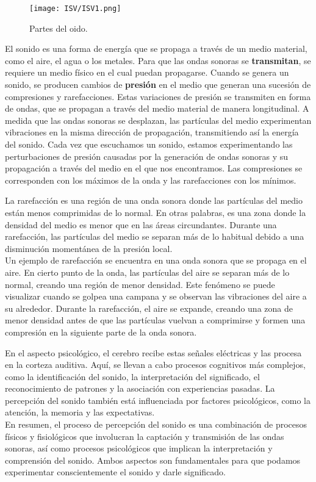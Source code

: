\documentclass[
	12pt, %
	fleqn, %
	a4paper, %
	oneside, %
]{LegrandOrangeBook}
\begin{document}
\begin{figure}[H]
\centering
\texttt{[image: ISV/ISV1.png]}
\caption{Partes del oido.}
\end{figure}
El sonido es una forma de energía que se propaga a través de un medio material, como el aire, el agua o los metales. Para que las ondas sonoras se \textbf{transmitan}, se requiere un medio físico en el cual puedan propagarse. Cuando se genera un sonido, se producen cambios de \textbf{presión} en el medio que generan una sucesión de compresiones y rarefacciones. Estas variaciones de presión se transmiten en forma de ondas, que se propagan a través del medio material de manera longitudinal. A medida que las ondas sonoras se desplazan, las partículas del medio experimentan vibraciones en la misma dirección de propagación, transmitiendo así la energía del sonido. Cada vez que escuchamos un sonido, estamos experimentando las perturbaciones de presión causadas por la generación de ondas sonoras y su propagación a través del medio en el que nos encontramos. Las compresiones se corresponden con los máximos de la onda y las rarefacciones con los mínimos.
\begin{vocabulary}[Rarefacción]
La rarefacción es una región de una onda sonora donde las partículas del medio están menos comprimidas de lo normal. En otras palabras, es una zona donde la densidad del medio es menor que en las áreas circundantes. Durante una rarefacción, las partículas del medio se separan más de lo habitual debido a una disminución momentánea de la presión local. \\
Un ejemplo de rarefacción se encuentra en una onda sonora que se propaga en el aire. En cierto punto de la onda, las partículas del aire se separan más de lo normal, creando una región de menor densidad. Este fenómeno se puede visualizar cuando se golpea una campana y se observan las vibraciones del aire a su alrededor. Durante la rarefacción, el aire se expande, creando una zona de menor densidad antes de que las partículas vuelvan a comprimirse y formen una compresión en la siguiente parte de la onda sonora.
\end{vocabulary}
En el aspecto psicológico, el cerebro recibe estas señales eléctricas y las procesa en la corteza auditiva. Aquí, se llevan a cabo procesos cognitivos más complejos, como la identificación del sonido, la interpretación del significado, el reconocimiento de patrones y la asociación con experiencias pasadas. La percepción del sonido también está influenciada por factores psicológicos, como la atención, la memoria y las expectativas.\\
En resumen, el proceso de percepción del sonido es una combinación de procesos físicos y fisiológicos que involucran la captación y transmisión de las ondas sonoras, así como procesos psicológicos que implican la interpretación y comprensión del sonido. Ambos aspectos son fundamentales para que podamos experimentar conscientemente el sonido y darle significado.
\end{document}
